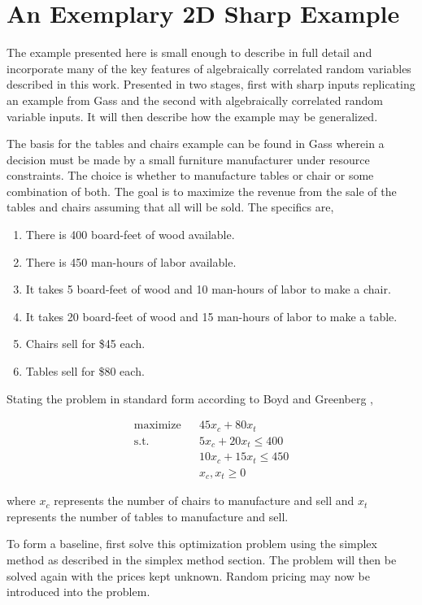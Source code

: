 \section{An Exemplary 2D Sharp Example}

The example presented here is small enough to describe in full detail and incorporate many of the key features of algebraically correlated random variables described in this work. Presented in two stages, first with sharp inputs replicating an example from Gass \cite{gass75} and the second with algebraically correlated random variable inputs. It will then describe how the example may be generalized.

The basis for the tables and chairs example can be found in Gass \cite{gass75} wherein a decision must be made by a small furniture manufacturer under resource constraints. The choice is whether to manufacture tables or chair or some combination of both. The goal is to maximize the revenue from the sale of the tables and chairs assuming that all will be sold. The specifics are,

\begin{enumerate}
\item There is 400 board-feet of wood available.
\item There is 450 man-hours of labor available.
\item It takes 5 board-feet of wood and 10 man-hours of labor to make a chair.
\item It takes 20 board-feet of wood and 15 man-hours of labor to make a table.
\item Chairs sell for \$45 each.
\item Tables sell for \$80 each.
\end{enumerate}

Stating the problem in standard form according to Boyd \cite{boyd04} and Greenberg \cite{greenberg95},

\begin{align*}
\text{maximize} && 45 x_c + 80 x_t\\
\text{s.t.}     && 5 x_c + 20 x_t \le 400\\
                && 10 x_c + 15 x_t \le 450\\
                && x_c, x_t \ge 0
\end{align*}

where $x_c$ represents the number of chairs to manufacture and sell and $x_t$ represents the number of tables to manufacture and sell.

To form a baseline, first solve this optimization problem using the simplex method as described in the simplex method section. The problem will then be solved again with the prices kept unknown. Random pricing may now be introduced into the problem.

